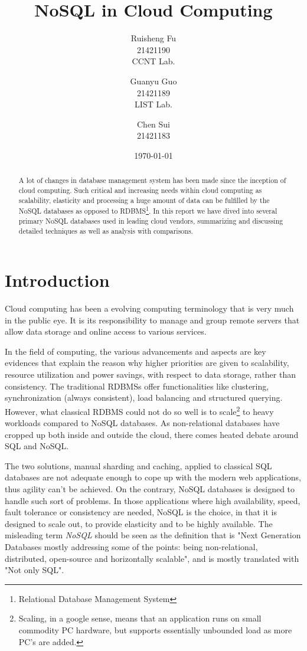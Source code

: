 \documentclass[12pt,letter]{article}
\author{Ruisheng Fu\\21421190\\CCNT Lab.
\and
Guanyu Guo\\21421189\\LIST Lab.
\and
Chen Sui\\21421183}
\title{NoSQL in Cloud Computing}
\date{\today}
\begin{document}
\maketitle
\tableofcontents

\begin{abstract}
A lot of changes in database management system has been made since the inception of cloud computing. Such critical and increasing needs within cloud computing as scalability, elasticity and  processing a huge amount of data can be fulfilled by the NoSQL databases as opposed to RDBMS\footnote{Relational Database Management System}. In this report we have dived into several primary NoSQL databases used in leading cloud vendors, summarizing and discussing detailed techniques as well as analysis with comparisons.
\end{abstract}

\section{Introduction}
Cloud computing has been a evolving computing terminology that is very much in the public eye. It is its responsibility to manage and group remote servers that allow data storage and online access to various services. 

In the field of computing, the various advancements and aspects are key evidences that explain the reason why higher priorities are given to scalability, resource utilization and power savings, with respect to data storage, rather than consistency. The traditional RDBMSs offer functionalities like clustering, synchronization (always consistent), load balancing and structured querying. However, what classical RDBMS could not do so well is to scale\footnote{Scaling, in a google sense, means that an application runs on small commodity PC hardware, but supports essentially unbounded load as more PC’s are added. } to heavy workloads compared to NoSQL databases. As non-relational databases have cropped up both inside and outside the cloud, there comes heated debate around SQL and NoSQL.\citep{Bain2009}

The two solutions, manual sharding and caching, applied to classical SQL databases are not adequate enough to cope up with the modern web applications, thus agility can't be achieved. On the contrary, NoSQL databases is designed to handle such sort of problems. In those applications where high availability, speed, fault tolerance or consistency are needed, NoSQL is the choice, in that it is designed to scale out, to provide elasticity and to be highly available. The misleading term \textit{NoSQL} should be seen as the definition\citep{Unknown2012} that is "Next Generation Databases mostly addressing some of the points: being non-relational, distributed, open-source and horizontally scalable", and is mostly translated with "Not only SQL".
\end{document}
